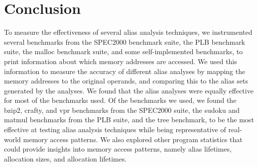 \chapter{Conclusion}

To measure the effectiveness of several alias analysis techniques, we instrumented several benchmarks from the SPEC2000 benchmark suite, the PLB benchmark suite, the malloc benchmark suite, and some self-implemented benchmarks, to print information about which memory addresses are accessed. We used this information to measure the accuracy of different alias analyses by mapping the memory addresses to the original operands, and comparing this to the alias sets generated by the analyses. We found that the alias analyses were equally effective for most of the benchmarks used. Of the benchmarks we used, we found the bzip2, crafty, and vpr benchmarks from the SPEC2000 suite, the sudoku and matmul benchmarks from the PLB suite, and the tree benchmark, to be the most effective at testing alias analysis techniques while being representative of real-world memory access patterns. We also explored other program statistics that could provide insights into memory access patterns, namely alias lifetimes, allocation sizes, and allocation lifetimes.
